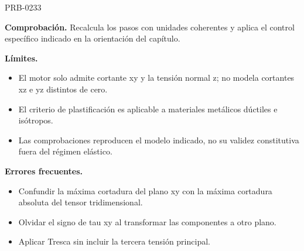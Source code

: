 \begin{studiumworked}{PRB-0233}
\par\textbf{Comprobación.} Recalcula los pasos con unidades coherentes y aplica el control específico indicado en la orientación del capítulo.

\textbf{Límites.}\begin{itemize}\item El motor solo admite cortante xy y la tensión normal z; no modela cortantes xz e yz distintos de cero.
\item El criterio de plastificación es aplicable a materiales metálicos dúctiles e isótropos.
\item Las comprobaciones reproducen el modelo indicado, no su validez constitutiva fuera del régimen elástico.\end{itemize}

\textbf{Errores frecuentes.}\begin{itemize}\item Confundir la máxima cortadura del plano xy con la máxima cortadura absoluta del tensor tridimensional.
\item Olvidar el signo de tau xy al transformar las componentes a otro plano.
\item Aplicar Tresca sin incluir la tercera tensión principal.\end{itemize}

\end{studiumworked}

\Needspace{.3\textheight}

